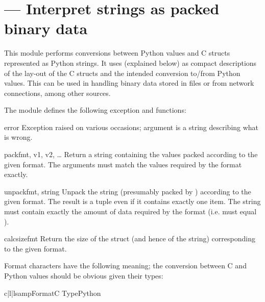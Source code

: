 \section{ ---
         Interpret strings as packed binary data}



This module performs conversions between Python values and C
structs represented as Python strings.  It uses 
(explained below) as compact descriptions of the lay-out of the C
structs and the intended conversion to/from Python values.  This can
be used in handling binary data stored in files or from network
connections, among other sources.

The module defines the following exception and functions:


\begin{excdesc}{error}
  Exception raised on various occasions; argument is a string
  describing what is wrong.
\end{excdesc}

\begin{funcdesc}{pack}{fmt, v1, v2, \textrm{\ldots}}
  Return a string containing the values
   packed according to the given
  format.  The arguments must match the values required by the format
  exactly.
\end{funcdesc}

\begin{funcdesc}{unpack}{fmt, string}
  Unpack the string (presumably packed by ) according to the given format.  The result is a
  tuple even if it contains exactly one item.  The string must contain
  exactly the amount of data required by the format (i.e.
   must equal ).
\end{funcdesc}

\begin{funcdesc}{calcsize}{fmt}
  Return the size of the struct (and hence of the string)
  corresponding to the given format.
\end{funcdesc}

Format characters have the following meaning; the conversion between
C and Python values should be obvious given their types:

\begin{tableiii}{c|l|l}{samp}{Format}{C Type}{Python}
\end{tableiii}

